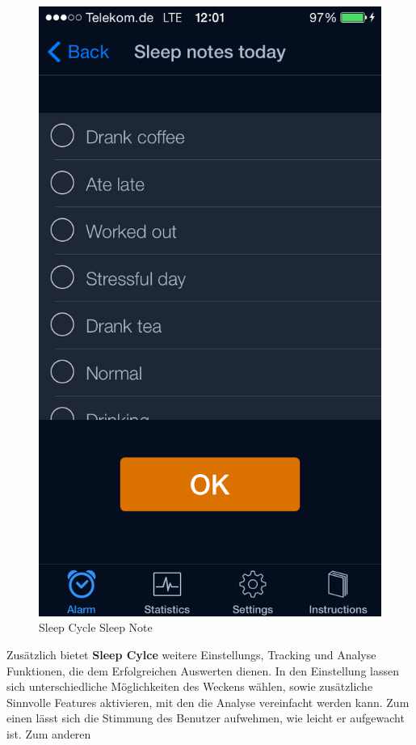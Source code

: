 \begin{figure}[]
\begin{minipage}[b]{0.47\textwidth}
    \includegraphics[scale=0.3]{images/SleepCycle/SleepNotesToday}  
    \caption{Sleep Cycle Sleep Note}
    \label{fig:SCSleepNoteToday}
  \end{minipage}
\end{figure}

Zusätzlich bietet \textbf{Sleep Cylce} weitere Einstellungs, Tracking und Analyse Funktionen, die dem Erfolgreichen Auswerten dienen.
In den Einstellung lassen sich unterschiedliche Möglichkeiten des Weckens wählen, sowie zusätzliche Sinnvolle Features aktivieren, mit den die Analyse vereinfacht werden kann.
Zum einen lässt sich die Stimmung des Benutzer aufwehmen, wie leicht er aufgewacht ist.
Zum anderen 


